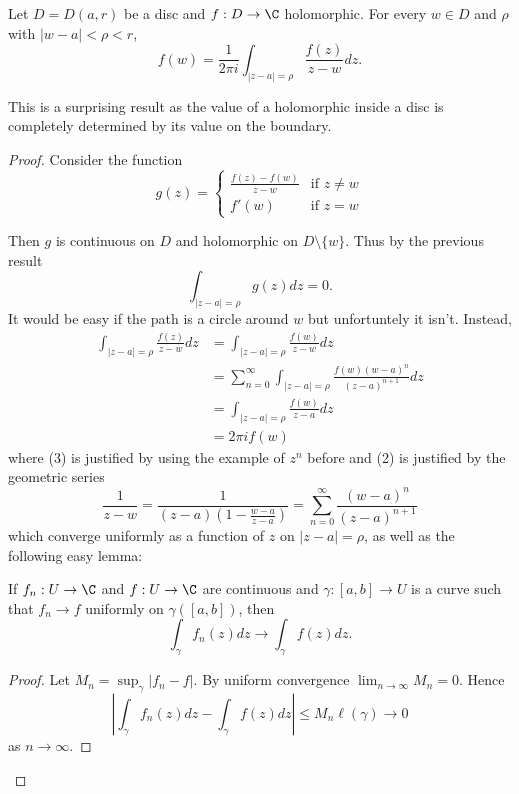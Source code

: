 \documentclass[a4paper]{article}
\begin{document}
\begin{theorem}
  Let \(D = D(a, r)\) be a disc and \(f: D \to \C\) holomorphic. For every \(w \in D\) and \(\rho\) with \(|w - a| < \rho < r\),
  \[
    f(w) = \frac{1}{2\pi i} \int_{|z - a| = \rho} \frac{f(z)}{z - w} dz.
  \]
\end{theorem}

This is a surprising result as the value of a holomorphic inside a disc is completely determined by its value on the boundary.

\begin{proof}
  Consider the function
  \[
    g(z) =
    \begin{cases}
      \frac{f(z) - f(w)}{z - w} & \text{if } z \neq w \\
      f'(w) & \text{if } z = w
    \end{cases}
  \]

Then \(g\) is continuous on \(D\) and holomorphic on \(D \setminus \{w\}\). Thus by the previous result
\[
  \int_{|z - a| = \rho} g(z)dz = 0.
\]
It would be easy if the path is a circle around \(w\) but unfortuntely it isn't. Instead, 
\begin{align}
  \int_{|z - a| = \rho} \frac{f(z)}{z - w} dz
  &= \int_{|z - a| = \rho} \frac{f(w)}{z - w} dz \\
  &= \sum_{n = 0}^\infty \int_{|z - a| = \rho} \frac{f(w)(w - a)^n}{(z - a)^{n + 1}} dz \\
  &= \int_{|z - a| = \rho} \frac{f(w)}{z - a} dz \\
  &= 2\pi i f(w)
\end{align}
where (3) is justified by using the example of \(z^n\) before and (2) is justified by the geometric series
\[
  \frac{1}{z - w}
  = \frac{1}{(z - a)\left( 1- \frac{w - a}{z - a} \right)}
  = \sum_{n = 0}^\infty \frac{(w - a)^n}{(z - a)^{n + 1}}
\]
which converge uniformly as a function of \(z\) on \(|z - a| = \rho\), as well as the following easy lemma:

\begin{lemma}
  If \(f_n: U \to \C\) and \(f: U \to \C\) are continuous and \(\gamma: [a, b] \to U\) is a curve such that \(f_n \to f\) uniformly on \(\gamma([a, b])\), then
  \[
    \int_\gamma f_n(z)dz \to \int_\gamma f(z) dz.
  \]
\end{lemma}

\begin{proof}
  Let \(M_n = \sup_\gamma |f_n - f|\). By uniform convergence \(\lim_{n \to \infty} M_n = 0\). Hence
  \[
    \left| \int_\gamma f_n(z) dz - \int_\gamma f(z) dz \right|
    \leq M_n \ell(\gamma) \to 0
  \]
  as \(n \to \infty\).
\end{proof}
\end{proof}
\end{document}
